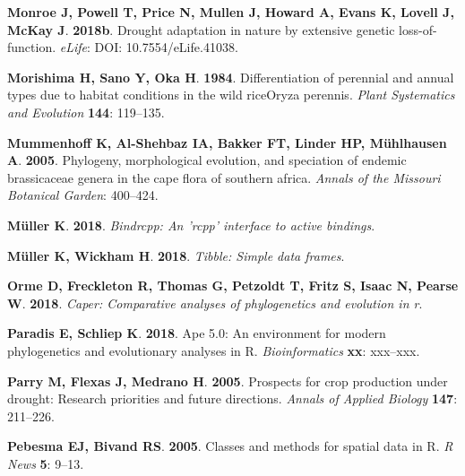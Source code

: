 \documentclass[man,floatsintext]{apa6}
\theoremstyle{definition}
\theoremstyle{definition}
\theoremstyle{definition}
\theoremstyle{remark}
\begin{document}
\leavevmode\hypertarget{ref-monroe2018drought}{}%
\textbf{\textnormal{Monroe J}, \textnormal{Powell T}, \textnormal{Price
N}, \textnormal{Mullen J}, \textnormal{Howard A}, \textnormal{Evans K},
\textnormal{Lovell J}, \textnormal{McKay J}}. \textbf{2018b}. Drought
adaptation in nature by extensive genetic loss-of-function.
\emph{eLife}: DOI: 10.7554/eLife.41038.

\leavevmode\hypertarget{ref-morishima1984differentiation}{}%
\textbf{\textnormal{Morishima H}, \textnormal{Sano Y}, \textnormal{Oka
H}}. \textbf{1984}. Differentiation of perennial and annual types due to
habitat conditions in the wild riceOryza perennis. \emph{Plant
Systematics and Evolution} \textbf{144}: 119--135.

\leavevmode\hypertarget{ref-mummenhoff2005phylogeny}{}%
\textbf{\textnormal{Mummenhoff K}, \textnormal{Al-Shehbaz IA},
\textnormal{Bakker FT}, \textnormal{Linder HP}, \textnormal{Mühlhausen
A}}. \textbf{2005}. Phylogeny, morphological evolution, and speciation
of endemic brassicaceae genera in the cape flora of southern africa.
\emph{Annals of the Missouri Botanical Garden}: 400--424.

\leavevmode\hypertarget{ref-R-bindrcpp}{}%
\textbf{\textnormal{Müller K}}. \textbf{2018}. \emph{Bindrcpp: An 'rcpp'
interface to active bindings}.

\leavevmode\hypertarget{ref-R-tibble}{}%
\textbf{\textnormal{Müller K}, \textnormal{Wickham H}}. \textbf{2018}.
\emph{Tibble: Simple data frames}.

\leavevmode\hypertarget{ref-R-caper}{}%
\textbf{\textnormal{Orme D}, \textnormal{Freckleton R},
\textnormal{Thomas G}, \textnormal{Petzoldt T}, \textnormal{Fritz S},
\textnormal{Isaac N}, \textnormal{Pearse W}}. \textbf{2018}.
\emph{Caper: Comparative analyses of phylogenetics and evolution in r}.

\leavevmode\hypertarget{ref-R-ape}{}%
\textbf{\textnormal{Paradis E}, \textnormal{Schliep K}}. \textbf{2018}.
Ape 5.0: An environment for modern phylogenetics and evolutionary
analyses in R. \emph{Bioinformatics} \textbf{xx}: xxx--xxx.

\leavevmode\hypertarget{ref-parry2005prospects}{}%
\textbf{\textnormal{Parry M}, \textnormal{Flexas J}, \textnormal{Medrano
H}}. \textbf{2005}. Prospects for crop production under drought:
Research priorities and future directions. \emph{Annals of Applied
Biology} \textbf{147}: 211--226.

\leavevmode\hypertarget{ref-R-sp}{}%
\textbf{\textnormal{Pebesma EJ}, \textnormal{Bivand RS}}. \textbf{2005}.
Classes and methods for spatial data in R. \emph{R News} \textbf{5}:
9--13.
\end{document}
